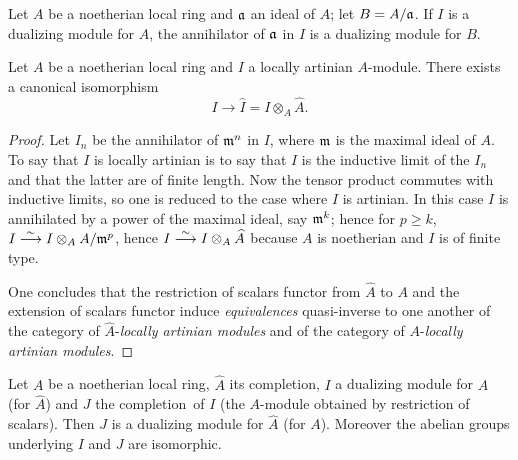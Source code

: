 \begin{corollary} \label{IV.4.4} Let $A$ be a noetherian local ring and $\mathfrak{a}$ an ideal of $A$; let $B=A/\mathfrak{a}$. If $I$ is a dualizing module for $A$, the annihilator of $\mathfrak{a}$ in $I$ is a dualizing module for $B$.
\end{corollary}

\begin{lemma} \label{IV.4.5} Let $A$ be a noetherian local ring and $I$ a locally artinian $A$-module. There exists a canonical isomorphism
$$
I\to \hat{I}=I\otimes_{A}\hat{A}.
$$
\end{lemma}

\begin{proof}
Let $I_{n}$ be the annihilator of $\mathfrak{m}^n$ in $I$, where $\mathfrak{m}$ is the maximal ideal of $A$. To say that $I$ is locally artinian is to say that $I$ is the inductive limit of the $I_{n}$ and that the latter are of finite length. Now the tensor product commutes with inductive limits, so one is reduced to the case where $I$ is artinian. In this case $I$ is annihilated by a power of the maximal ideal, say $\mathfrak{m}^{k}$; hence for $p\geq k$, $I\overset{\sim}{\longrightarrow} I\otimes_{A}A/\mathfrak{m}^{p}$, hence $I\overset{\sim}{\longrightarrow} I\otimes_{A}\widehat{A}$ because $A$ is noetherian and $I$ is of finite type.

One concludes that the restriction of scalars functor from $\hat{A}$ to $A$ and the extension of scalars functor induce \emph{equivalences} quasi-inverse to one another of the category of $\hat{A}$-\emph{locally artinian modules} and of the category of $A$-\emph{locally artinian modules}.
\skipqed
\end{proof}

\begin{proposition} \label{IV.4.6}
Let $A$ be a noetherian local ring, $\hat{A}$ its completion, $I$ a dualizing module for $A$ (\resp for $\hat{A}$) and $J$ the completion\, of $I$ (\resp the $A$-module obtained by restriction of scalars). Then $J$ is a dualizing module for $\hat{A}$ (\resp for $A$). Moreover the abelian groups underlying $I$ and $J$ are isomorphic.
\end{proposition}

